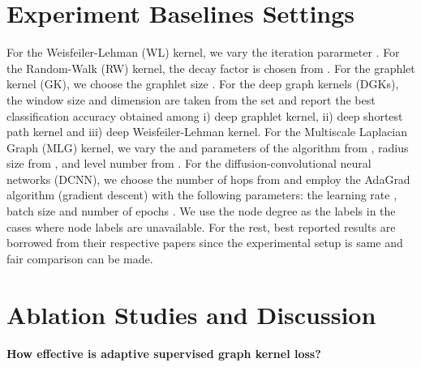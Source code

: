 \documentclass{article}
\begin{document}
\section{Experiment Baselines Settings }

For the Weisfeiler-Lehman (WL) kernel, we vary the iteration pararmeter . For the Random-Walk (RW) kernel, the decay factor is chosen from . For the graphlet kernel (GK), we choose the graphlet  size .  For the deep graph kernels (DGKs),  the  window size and dimension are taken from the set  and report the best classification accuracy obtained among i) deep graphlet kernel, ii) deep shortest path kernel and iii) deep Weisfeiler-Lehman kernel. For the Multiscale Laplacian Graph (MLG) kernel, we vary the  and  parameters of the algorithm from , radius size from , and level number from . For  the diffusion-convolutional neural networks (DCNN), we choose the number of hops from  and employ the AdaGrad algorithm (gradient descent) with the following parameters: the learning rate , batch size  and number of  epochs . We use the node degree   as the labels  in the cases where node labels are unavailable.  For the rest, best reported results are borrowed from their respective papers since the experimental  setup is same and fair comparison can be made.



\section{Ablation Studies and Discussion}\label{sec:ablation_study}

\noindent \textbf{How   effective is adaptive supervised graph kernel loss?} 
\end{document}
